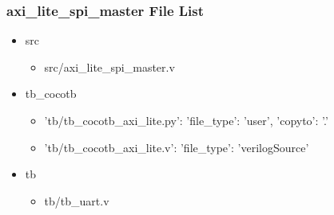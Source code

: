 \subsubsection{axi\_lite\_spi\_master File List}
\begin{itemize}
\item src
	\begin{itemize}
	\item src/axi\_lite\_spi\_master.v
	\end{itemize}
\item tb\_cocotb
	\begin{itemize}
	\item {'tb/tb\_cocotb\_axi\_lite.py': {'file\_type': 'user', 'copyto': '.'}}
	\item {'tb/tb\_cocotb\_axi\_lite.v': {'file\_type': 'verilogSource'}}
	\end{itemize}
\item tb
	\begin{itemize}
	\item tb/tb\_uart.v
	\end{itemize}
\end{itemize}
